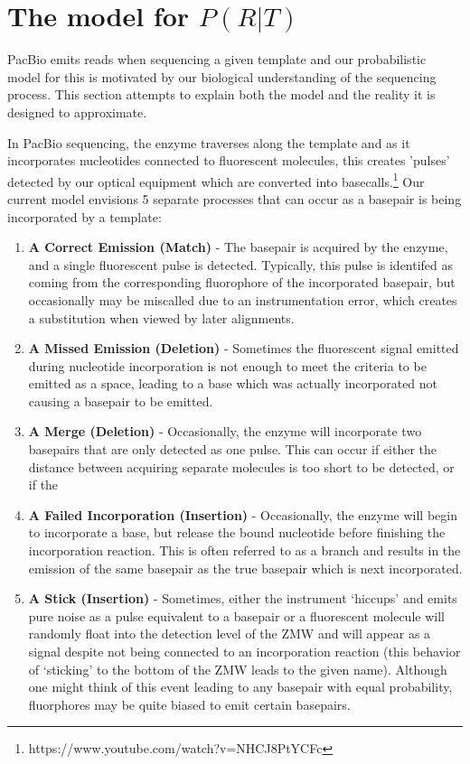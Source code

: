 \documentclass[fleqn,10pt]{SelfArx} %
\begin{document}
\section{The model for $P(R|T)$}

PacBio emits reads when sequencing a given template and our probabilistic model for this is motivated by our biological understanding of the sequencing process.  This section attempts to explain both the model and the reality it is designed to approximate.

In PacBio sequencing, the enzyme traverses along the template and as it incorporates nucleotides connected to fluorescent molecules, this creates 'pulses' detected by our optical equipment which are converted into basecalls.\footnote{https://www.youtube.com/watch?v=NHCJ8PtYCFc}  Our current model envisions 5 separate processes that can occur as a basepair is being incorporated by a template:


\begin{enumerate}
  \item \textbf{A Correct Emission (Match)} - The basepair is acquired by the enzyme, and a single fluorescent pulse is detected.  Typically, this pulse is identifed as coming from the corresponding fluorophore of the incorporated basepair, but occasionally may be miscalled due to an instrumentation error, which creates a substitution when viewed by later alignments.
  \item \textbf{A Missed Emission (Deletion)} - Sometimes the fluorescent signal emitted during nucleotide incorporation is not enough to meet the criteria to be emitted as a space, leading to a base which was actually incorporated not causing a basepair to be emitted.
  
    \item \textbf{A Merge (Deletion) } - Occasionally, the enzyme will incorporate two basepairs that are only detected as one pulse.  This can occur if either the distance between acquiring separate molecules is too short to be detected, or if the   
   
  
  \item \textbf{A Failed Incorporation (Insertion) } - Occasionally, the enzyme will begin to incorporate a base, but release the bound nucleotide before finishing the incorporation reaction.  This is often referred to as a branch and results in the emission of the same basepair as the true basepair which is next incorporated.
  
  \item \textbf{A Stick (Insertion) } - Sometimes, either the instrument `hiccups' and emits pure noise as a pulse equivalent to a basepair or a fluorescent molecule will randomly float into the detection level of the ZMW and will appear as a signal despite not being connected to an incorporation reaction (this behavior of `sticking' to the bottom of the ZMW leads to the given name).  Although one might think of this event leading to any basepair with equal probability, fluorphores may be quite biased to emit certain basepairs.
     
\end{enumerate}
\end{document}
